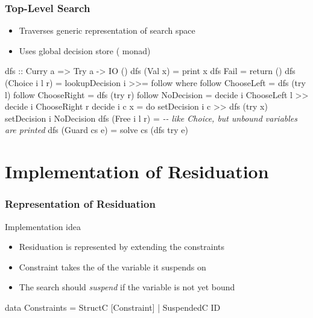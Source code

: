 \documentclass[
,hyperref={pdfpagelabels=false}
,xcolor=dvipsnames
]{beamer}
\newcommand{\blocktitle}[1]{%
{\medskip\usebeamerfont{subtitle}\usebeamercolor[fg]{subtitle}#1\smallskip}
}
\newcommand{\comment}[1]{\textsl{-{}- #1}}
\begin{document}
\begin{frame}[fragile]%
\frametitle{Top-Level Search}

\begin{itemize}
  \item Traverses generic representation of search space
  \item Uses global decision store ( monad)
\end{itemize}

\begin{haskell}
dfs :: Curry a => Try a -> IO ()
dfs (Val x)        = print x
dfs Fail           = return ()
dfs (Choice i l r) = lookupDecision i >>= follow
  where
  follow ChooseLeft  = dfs (try l)
  follow ChooseRight = dfs (try r)
  follow NoDecision  = decide i ChooseLeft l >> decide i ChooseRight r \medskip
  decide i c x = do setDecision i c >> dfs (try x)
                    setDecision i NoDecision
dfs (Free i l r)   = \comment{like Choice, but unbound variables are printed}
dfs (Guard cs e)   = solve cs (dfs try e)
\end{haskell}
\end{frame}


\section{Implementation of Residuation}

\begin{frame}[fragile]%
\frametitle{Representation of Residuation}

\blocktitle{Implementation idea}

\begin{itemize}
\item Residuation is represented by extending the constraints
\item Constraint takes the  of the variable it suspends on
\item The search should \emph{suspend} if the variable is not yet bound
\end{itemize}

\begin{haskell}
data Constraints = StructC [Constraint]
                 \alert{| SuspendedC ID}
\end{haskell}

\end{frame}
\end{document}
